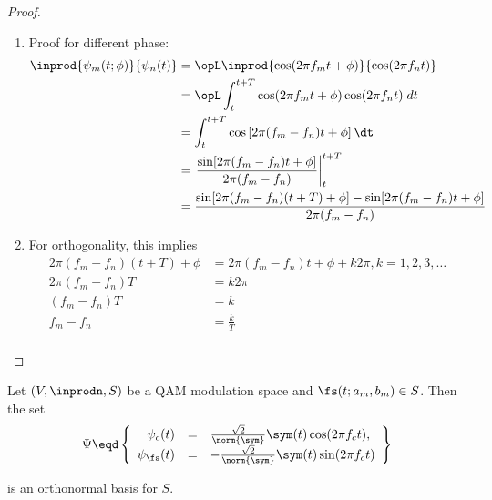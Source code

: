 \begin{proof}
\begin{enumerate}
\item Proof for different phase:
  \begin{align*}
     \inprod{\psi_m(t;\phi)}{\psi_n(t)}
        &= \opL \inprod{\cos(2\pi f_m t + \phi)}{\cos(2\pi f_n t)}
      \\&= \opL \int_t^{t+T} \cos(2\pi f_m t + \phi) \cos(2\pi f_n t) \; dt
      \\&= \int_t^{t+T} \cos\left[2\pi (f_m-f_n) t + \phi\right] \dt
      \\&= \left.\frac{\sin[2\pi (f_m-f_n) t + \phi]}
                      {2\pi(f_m-f_n)}
           \right|_t^{t+T}
      \\&= \frac{\sin[2\pi (f_m-f_n)(t+T) + \phi]-\sin[2\pi (f_m-f_n)t + \phi]}{2\pi(f_m-f_n)}
  \end{align*}

\item For orthogonality, this implies
  \begin{align*}
     2\pi (f_m-f_n)(t+T) + \phi &= 2\pi (f_m-f_n)t + \phi + k2\pi, k=1,2,3,\ldots \\
     2\pi (f_m-f_n)T  &= k2\pi \\
     (f_m-f_n)T  &= k \\
     f_m-f_n  &= \frac{k}{T} \\
  \end{align*}
\end{enumerate}
\end{proof}

\begin{proposition}
\label{lem:QAM_basis}
Let $(V, \inprodn, S)$ be a QAM modulation space and 
$\fs(t;a_m,b_m)\in S$.
Then the set
\[
   \Psi \eqd \left\{ \begin{array}{rcl}
      \psi_c(t) &=& \frac{\sqrt{2}}{\norm{\sym}} \sym(t) \cos(2\pi f_c t), \\
      \psi_\fs(t) &=& -\frac{\sqrt{2}}{\norm{\sym}} \sym(t) \sin(2\pi f_c t)
      \end{array}\right\}
\]

is an orthonormal basis for $S$.
\end{proposition}

